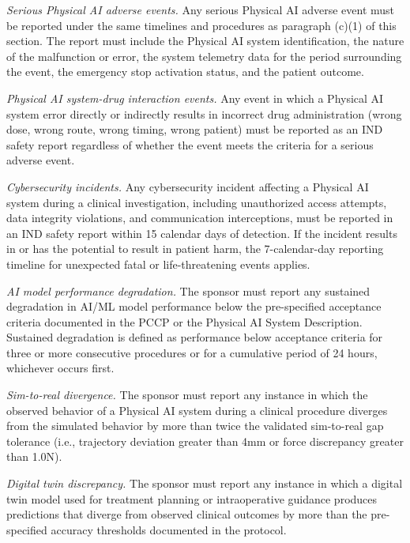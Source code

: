 \begin{description}[leftmargin=0.8cm,style=sameline]
\item[(i)] \textit{Serious Physical AI adverse events.} Any serious Physical AI adverse event must be reported under the same timelines and procedures as paragraph (c)(1) of this section. The report must include the Physical AI system identification, the nature of the malfunction or error, the system telemetry data for the period surrounding the event, the emergency stop activation status, and the patient outcome.
\item[(ii)] \textit{Physical AI system-drug interaction events.} Any event in which a Physical AI system error directly or indirectly results in incorrect drug administration (wrong dose, wrong route, wrong timing, wrong patient) must be reported as an IND safety report regardless of whether the event meets the criteria for a serious adverse event.
\item[(iii)] \textit{Cybersecurity incidents.} Any cybersecurity incident affecting a Physical AI system during a clinical investigation, including unauthorized access attempts, data integrity violations, and communication interceptions, must be reported in an IND safety report within 15 calendar days of detection. If the incident results in or has the potential to result in patient harm, the 7-calendar-day reporting timeline for unexpected fatal or life-threatening events applies.
\item[(iv)] \textit{AI model performance degradation.} The sponsor must report any sustained degradation in AI/ML model performance below the pre-specified acceptance criteria documented in the PCCP or the Physical AI System Description. Sustained degradation is defined as performance below acceptance criteria for three or more consecutive procedures or for a cumulative period of 24 hours, whichever occurs first.
\item[(v)] \textit{Sim-to-real divergence.} The sponsor must report any instance in which the observed behavior of a Physical AI system during a clinical procedure diverges from the simulated behavior by more than twice the validated sim-to-real gap tolerance (i.e., trajectory deviation greater than 4mm or force discrepancy greater than 1.0N).
\item[(vi)] \textit{Digital twin discrepancy.} The sponsor must report any instance in which a digital twin model used for treatment planning or intraoperative guidance produces predictions that diverge from observed clinical outcomes by more than the pre-specified accuracy thresholds documented in the protocol.
\end{description}

